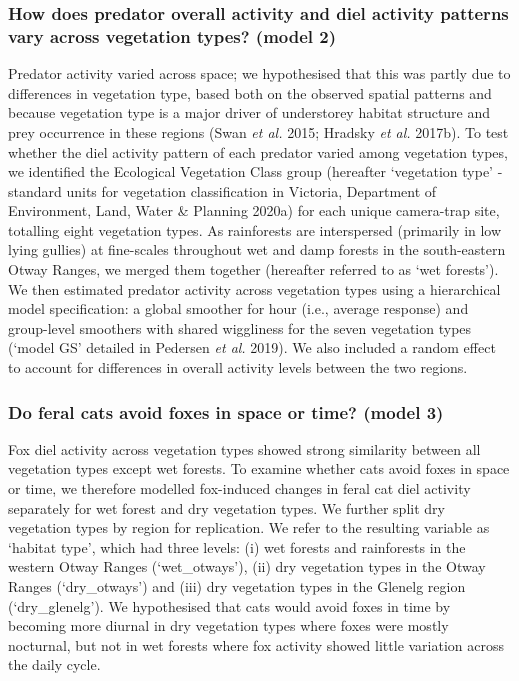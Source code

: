 \documentclass[11pt,a4paper,titlepage,twoside,openright]{style/unimelbthesis}
\begin{document}
\begin{mainmatter}
{\subsubsection{How does predator overall activity and diel activity patterns vary across vegetation types? (model 2)}\label{how-does-predator-overall-activity-and-diel-activity-patterns-vary-across-vegetation-types-model-2}}

Predator activity varied across space; we hypothesised that this was partly due to differences in vegetation type, based both on the observed spatial patterns and because vegetation type is a major driver of understorey habitat structure and prey occurrence in these regions (Swan \emph{et al.} 2015; Hradsky \emph{et al.} 2017b). To test whether the diel activity pattern of each predator varied among vegetation types, we identified the Ecological Vegetation Class group (hereafter `vegetation type' - standard units for vegetation classification in Victoria, Department of Environment, Land, Water \& Planning 2020a) for each unique camera-trap site, totalling eight vegetation types. As rainforests are interspersed (primarily in low lying gullies) at fine-scales throughout wet and damp forests in the south-eastern Otway Ranges, we merged them together (hereafter referred to as `wet forests'). We then estimated predator activity across vegetation types using a hierarchical model specification: a global smoother for hour (i.e., average response) and group-level smoothers with shared wiggliness for the seven vegetation types (`model GS' detailed in Pedersen \emph{et al.} 2019). We also included a random effect to account for differences in overall activity levels between the two regions.

\hypertarget{do-feral-cats-avoid-foxes-in-space-or-time-model-3}{%
\subsubsection{Do feral cats avoid foxes in space or time? (model 3)}\label{do-feral-cats-avoid-foxes-in-space-or-time-model-3}}

Fox diel activity across vegetation types showed strong similarity between all vegetation types except wet forests. To examine whether cats avoid foxes in space or time, we therefore modelled fox-induced changes in feral cat diel activity separately for wet forest and dry vegetation types. We further split dry vegetation types by region for replication. We refer to the resulting variable as `habitat type', which had three levels: (i) wet forests and rainforests in the western Otway Ranges (`wet\_otways'), (ii) dry vegetation types in the Otway Ranges (`dry\_otways') and (iii) dry vegetation types in the Glenelg region (`dry\_glenelg'). We hypothesised that cats would avoid foxes in time by becoming more diurnal in dry vegetation types where foxes were mostly nocturnal, but not in wet forests where fox activity showed little variation across the daily cycle.


\end{mainmatter}
\end{document}
